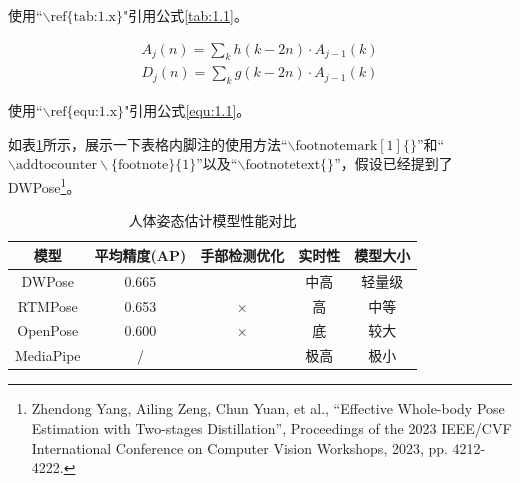 \documentclass[a4paper,scheme=chinese,linespread=1.5]{ctexbook} %
\begin{document}
	使用“\textbf{$\backslash \text{ref\{tab:1.x\}}$}"引用公式\ref{tab:1.1}。
	
	\begin{align}
		A_j(n)= \sum_{k}^{}  h(k-2n) \cdot A_{j-1}(k) \\
		D_j(n)= \sum_{k}^{}  g(k-2n) \cdot A_{j-1}(k)
		\label{equ:1.1}
	\end{align}
	
	使用“\textbf{$\backslash \text{ref\{equ:1.x\}}$}"引用公式\ref{equ:1.1}。
	
	\newpage
	
	如表\ref{tab:1.2}所示，展示一下表格内脚注的使用方法“$\backslash \text{footnotemark} [ 1 ]\{\}$”和“$\backslash \text{addtocounter} \backslash \text{\{footnote\}\{1\}}$”以及“$\backslash \text{footnotetext\{\}}$”，假设已经提到了DWPose\footnote{Zhendong Yang, Ailing Zeng, Chun Yuan, et al., “Effective Whole-body Pose Estimation with Two-stages Distillation”, Proceedings of the 2023 IEEE/CVF International Conference on Computer Vision Workshops, 2023, pp. 4212-4222.}。
	
	\begin{table}[H]
		\centering
		\caption{人体姿态估计模型性能对比}
		\vspace*{-1em}
		\begin{tabular}{ccccc} %
			\toprule[1.5pt]
			模型   &  平均精度(AP) & 手部检测优化 & 实时性 & 模型大小 \\ \midrule[0.75pt]
			DWPose\footnotemark[1]{}    & 0.665      & \checkmark                 & 中高       & 轻量级         \\
			RTMPose\footnotemark{}     & 0.653      & $\times$                & 高      &  中等          \\
			OpenPose\footnotemark{}    & 0.600        & $\times$                & 底       &  较大            \\ \cmidrule[0.5pt]{1-2}
			MediaPipe\footnotemark{}     & /      &  \checkmark                 & 极高       &  极小        \\
			\bottomrule[1.5pt]
		\end{tabular}
		\label{tab:1.2}
	\end{table}
	
	\setcounter{footnote}{2}
	
\end{document}
